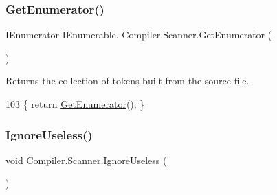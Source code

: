 \subsubsection{\texorpdfstring{Get\+Enumerator()}{GetEnumerator()}\hspace{0.1cm}{\footnotesize\ttfamily [2/2]}}
{\footnotesize\ttfamily I\+Enumerator I\+Enumerable. Compiler.\+Scanner.\+Get\+Enumerator (\begin{DoxyParamCaption}{ }\end{DoxyParamCaption})\hspace{0.3cm}{\ttfamily [private]}}

Returns the collection of tokens built from the source file. 
\begin{DoxyCode}
103 \{ \textcolor{keywordflow}{return} \mbox{\hyperlink{class_compiler_1_1_scanner_aea1e54cd0fb8a4b19f9403be60720ff9}{GetEnumerator}}(); \}
\end{DoxyCode}
\mbox{\label{class_compiler_1_1_scanner_abd981910f7c2f50c9ed8e778d93fffdd}} 
\subsubsection{\texorpdfstring{Ignore\+Useless()}{IgnoreUseless()}}
{\footnotesize\ttfamily void Compiler.\+Scanner.\+Ignore\+Useless (\begin{DoxyParamCaption}{ }\end{DoxyParamCaption})\hspace{0.3cm}{\ttfamily [protected]}}

